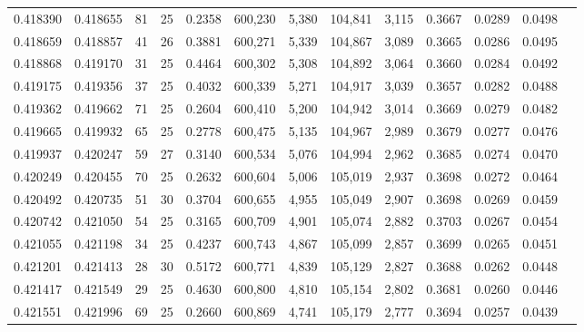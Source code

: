 \begin{tabular}{rrrrrrrrrrrrr}
0.418390 & 0.418655 &    81 &  25 &                                     0.2358 & 600,230 &   5,380 & 104,841 &   3,115 & 0.3667 & 0.0289 & 0.0498 \\
0.418659 & 0.418857 &    41 &  26 &                                     0.3881 & 600,271 &   5,339 & 104,867 &   3,089 & 0.3665 & 0.0286 & 0.0495 \\
0.418868 & 0.419170 &    31 &  25 &                                     0.4464 & 600,302 &   5,308 & 104,892 &   3,064 & 0.3660 & 0.0284 & 0.0492 \\
0.419175 & 0.419356 &    37 &  25 &                                     0.4032 & 600,339 &   5,271 & 104,917 &   3,039 & 0.3657 & 0.0282 & 0.0488 \\
0.419362 & 0.419662 &    71 &  25 &                                     0.2604 & 600,410 &   5,200 & 104,942 &   3,014 & 0.3669 & 0.0279 & 0.0482 \\
0.419665 & 0.419932 &    65 &  25 &                                     0.2778 & 600,475 &   5,135 & 104,967 &   2,989 & 0.3679 & 0.0277 & 0.0476 \\
0.419937 & 0.420247 &    59 &  27 &                                     0.3140 & 600,534 &   5,076 & 104,994 &   2,962 & 0.3685 & 0.0274 & 0.0470 \\
0.420249 & 0.420455 &    70 &  25 &                                     0.2632 & 600,604 &   5,006 & 105,019 &   2,937 & 0.3698 & 0.0272 & 0.0464 \\
0.420492 & 0.420735 &    51 &  30 &                                     0.3704 & 600,655 &   4,955 & 105,049 &   2,907 & 0.3698 & 0.0269 & 0.0459 \\
0.420742 & 0.421050 &    54 &  25 &                                     0.3165 & 600,709 &   4,901 & 105,074 &   2,882 & 0.3703 & 0.0267 & 0.0454 \\
0.421055 & 0.421198 &    34 &  25 &                                     0.4237 & 600,743 &   4,867 & 105,099 &   2,857 & 0.3699 & 0.0265 & 0.0451 \\
0.421201 & 0.421413 &    28 &  30 &                                     0.5172 & 600,771 &   4,839 & 105,129 &   2,827 & 0.3688 & 0.0262 & 0.0448 \\
0.421417 & 0.421549 &    29 &  25 &                                     0.4630 & 600,800 &   4,810 & 105,154 &   2,802 & 0.3681 & 0.0260 & 0.0446 \\
0.421551 & 0.421996 &    69 &  25 &                                     0.2660 & 600,869 &   4,741 & 105,179 &   2,777 & 0.3694 & 0.0257 & 0.0439 \\

\end{tabular}
